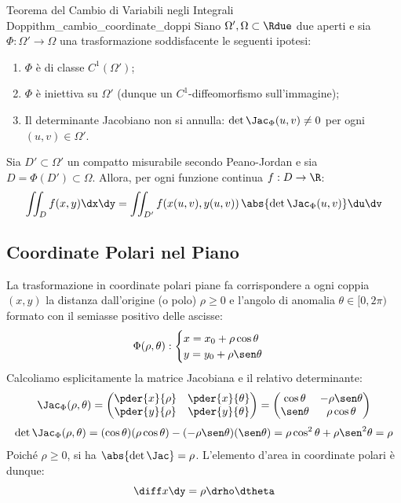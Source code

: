 \begin{teorema}{Teorema del Cambio di Variabili negli Integrali Doppi}{thm_cambio_coordinate_doppi}
Siano $\Omega', \Omega \subset \Rdue$ due aperti e sia $\Phi: \Omega' \to \Omega$ una trasformazione soddisfacente le seguenti ipotesi:
\begin{enumerate}
    \item $\Phi$ è di classe $C^1(\Omega')$;
    \item $\Phi$ è iniettiva su $\Omega'$ (dunque un $C^1$-diffeomorfismo sull'immagine);
    \item Il determinante Jacobiano non si annulla: $\det \Jac_\Phi(u,v) \neq 0$ per ogni $(u,v) \in \Omega'$.
\end{enumerate}
Sia $D' \subset \Omega'$ un compatto misurabile secondo Peano-Jordan e sia $D = \Phi(D') \subset \Omega$.
Allora, per ogni funzione continua $f: D \to \R$:
\[
\iint_D f(x,y) \dx\dy = \iint_{D'} f(x(u,v), y(u,v)) \, \abs{\det \Jac_\Phi(u,v)} \du\dv
\]
\end{teorema}

\subsection{Coordinate Polari nel Piano}

La trasformazione in coordinate polari piane fa corrispondere a ogni coppia $(x,y)$ la distanza dall'origine (o polo) $\rho \ge 0$ e l'angolo di anomalia $\theta \in [0, 2\pi)$ formato con il semiasse positivo delle ascisse:
\[
\Phi(\rho, \theta): \begin{cases} x = x_0 + \rho \cos\theta \\ y = y_0 + \rho \sen\theta \end{cases}
\]
Calcoliamo esplicitamente la matrice Jacobiana e il relativo determinante:
\[
\Jac_\Phi(\rho, \theta) = \begin{pmatrix} \pder{x}{\rho} & \pder{x}{\theta} \\ \pder{y}{\rho} & \pder{y}{\theta} \end{pmatrix} = \begin{pmatrix} \cos\theta & -\rho \sen\theta \\ \sen\theta & \rho \cos\theta \end{pmatrix}
\]
\[
\det \Jac_\Phi(\rho, \theta) = (\cos\theta)(\rho \cos\theta) - (-\rho \sen\theta)(\sen\theta) = \rho \cos^2\theta + \rho \sen^2\theta = \rho
\]
Poiché $\rho \ge 0$, si ha $\abs{\det \Jac} = \rho$. L'elemento d'area in coordinate polari è dunque:
\[
\diff x \dy = \rho \drho \dtheta
\]

